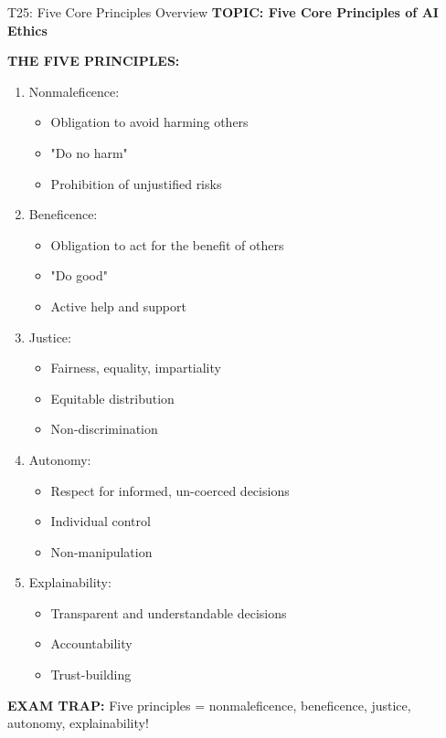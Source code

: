 \documentclass[8pt]{beamer}
\begin{document}
	\begin{frame}{T25: Five Core Principles Overview}
		\fontsize{6.5}{7.5}\selectfont
		\textbf{TOPIC: Five Core Principles of AI Ethics}
		
		\vspace{0.1cm}
		\textbf{THE FIVE PRINCIPLES:}
		\begin{enumerate}
			\item \textcolor{myblue}{Nonmaleficence:}
			\begin{itemize}
				\item Obligation to avoid harming others
				\item "Do no harm"
				\item Prohibition of unjustified risks
			\end{itemize}
			\item \textcolor{myblue}{Beneficence:}
			\begin{itemize}
				\item Obligation to act for the benefit of others
				\item "Do good"
				\item Active help and support
			\end{itemize}
			\item \textcolor{myblue}{Justice:}
			\begin{itemize}
				\item Fairness, equality, impartiality
				\item Equitable distribution
				\item Non-discrimination
			\end{itemize}
			\item \textcolor{myblue}{Autonomy:}
			\begin{itemize}
				\item Respect for informed, un-coerced decisions
				\item Individual control
				\item Non-manipulation
			\end{itemize}
			\item \textcolor{myblue}{Explainability:}
			\begin{itemize}
				\item Transparent and understandable decisions
				\item Accountability
				\item Trust-building
			\end{itemize}
		\end{enumerate}
		
		\textcolor{myred}{\textbf{EXAM TRAP:}} Five principles = \textcolor{myblue}{nonmaleficence, beneficence, justice, autonomy, explainability}!
	\end{frame}
	
\end{document}
